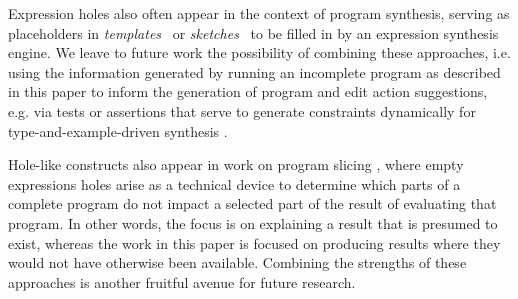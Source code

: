 Expression holes also often appear in the context of program synthesis, serving as
placeholders in \emph{templates}~\cite{srivastava2013template} or
\emph{sketches}~\cite{solar2009sketching} to be filled in by an expression
synthesis engine. We leave to future work the possibility of combining these approaches, i.e. using the information generated by running an incomplete program as described in this paper to inform the generation of program and edit action suggestions, e.g. via tests or assertions that serve to generate constraints dynamically for type-and-example-driven synthesis \cite{DBLP:conf/popl/FrankleOWZ16}. 





Hole-like constructs also appear in work on program slicing
\cite{DBLP:conf/icfp/PereraACL12,DBLP:journals/pacmpl/RicciottiSPC17}, where empty expressions holes arise as a technical device to determine which parts of a complete program do not impact a selected part of the result of evaluating that program. In other words, the focus is on explaining a result that is presumed to exist, whereas the work in this paper is focused on producing results where they would not have otherwise been available. Combining the strengths of these approaches is another fruitful avenue for future research. 

